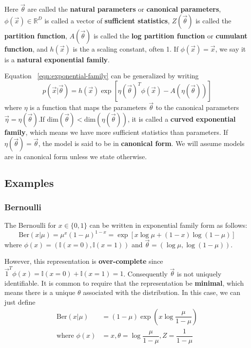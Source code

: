 Here $\vec{\theta}$ are called the \textbf{natural parameters} or \textbf{canonical parameters}, $\phi(\vec{x}) \in \mathbb{R}^D$ is called a vector of \textbf{sufficient statistics}, $Z(\vec{\theta})$ is called the \textbf{partition function}, $A(\vec{\theta})$ is called the \textbf{log partition function} or \textbf{cumulant function}, and $h(\vec{x})$ is the a scaling constant, often 1. If $\phi(\vec{x})=\vec{x}$, we say it is a \textbf{natural exponential family}.

Equation ~\eqref{eqn:exponential-family} can be generalized by writing
\begin{equation}
p(\vec{x}|\vec{\theta}) = h(\vec{x})\exp[\eta(\vec{\theta})^T\phi(\vec{x})-A(\eta(\vec{\theta}))]
\end{equation}
where $\eta$ is a function that maps the parameters $\vec{\theta}$ to the canonical parameters $\vec{\eta}=\eta(\vec{\theta})$.If $\mathrm{dim}(\vec{\theta})<\mathrm{dim}(\eta(\vec{\theta}))$, it is called a \textbf{curved exponential family}, which means we have more sufficient statistics than parameters. If $\eta(\vec{\theta})=\vec{\theta}$, the model is said to be in \textbf{canonical form}. We will assume models are in canonical form unless we state otherwise.


\subsection{Examples}


\subsubsection{Bernoulli}
The Bernoulli for $x \in \{0,1\}$ can be written in exponential family form as follows:
\begin{equation}
\mathrm{Ber}(x|\mu)=\mu^x(1-\mu)^{1-x}=\exp[x\log\mu+(1-x)\log(1-\mu)]
\end{equation}
where $\phi(x)=(\mathbb{I}(x=0),\mathbb{I}(x=1))$ and $\vec{\theta}=(\log\mu,\log(1-\mu))$. 

However, this representation is \textbf{over-complete} since $\vec{1}^T\phi(x)=\mathbb{I}(x=0)+\mathbb{I}(x=1)=1$. Consequently $\vec{\theta}$ is not uniquely identifiable. It is common to require that the representation be \textbf{minimal}, which means there is a unique $\theta$ associated with the distribution. In this case, we can just define
\begin{align}
\mathrm{Ber}(x|\mu) & =(1-\mu)\exp\left(x\log\dfrac{\mu}{1-\mu}\right) \\
\text{where } \phi(x) & =x, \theta=\log\dfrac{\mu}{1-\mu}, Z=\dfrac{1}{1-\mu}  \nonumber
\end{align}

